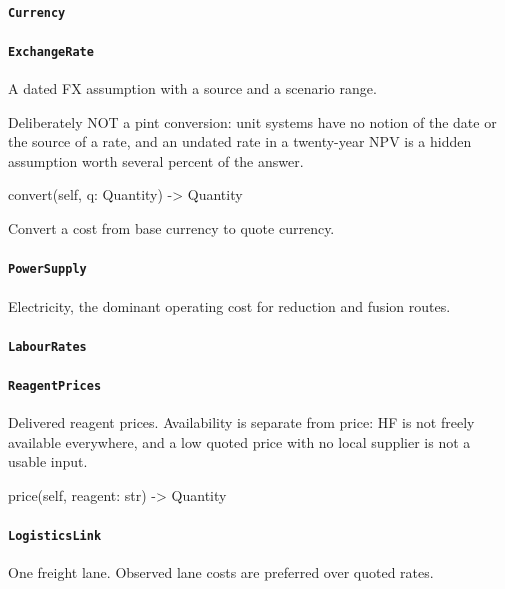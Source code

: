\documentclass[10pt,a4paper,twoside]{report}
\begin{document}
\paragraph{\texttt{Currency}}

\paragraph{\texttt{ExchangeRate}}

A dated FX assumption with a source and a scenario range.

Deliberately NOT a pint conversion: unit systems have no notion of the date or the source of a rate, and an undated rate in a twenty-year NPV is a hidden assumption worth several percent of the answer.

\begin{verbatimsmall}
convert(self, q: Quantity) -> Quantity
\end{verbatimsmall}

Convert a cost from base currency to quote currency.

\paragraph{\texttt{PowerSupply}}

Electricity, the dominant operating cost for reduction and fusion routes.

\paragraph{\texttt{LabourRates}}

\paragraph{\texttt{ReagentPrices}}

Delivered reagent prices. Availability is separate from price: HF is not freely available everywhere, and a low quoted price with no local supplier is not a usable input.

\begin{verbatimsmall}
price(self, reagent: str) -> Quantity
\end{verbatimsmall}

\paragraph{\texttt{LogisticsLink}}

One freight lane. Observed lane costs are preferred over quoted rates.
\end{document}
